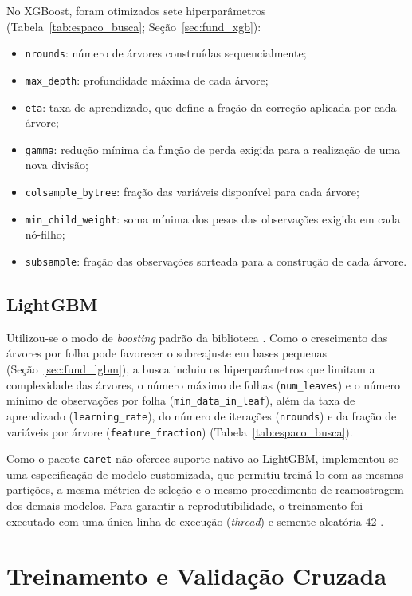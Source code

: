 No XGBoost, foram otimizados sete hiperparâmetros (Tabela~\ref{tab:espaco_busca}; Seção~\ref{sec:fund_xgb}):

\begin{itemize}
    \item \texttt{nrounds}: número de árvores construídas sequencialmente;
    \item \texttt{max\_depth}: profundidade máxima de cada árvore;
    \item \texttt{eta}: taxa de aprendizado, que define a fração da correção aplicada por cada árvore;
    \item \texttt{gamma}: redução mínima da função de perda exigida para a realização de uma nova divisão;
    \item \texttt{colsample\_bytree}: fração das variáveis disponível para cada árvore;
    \item \texttt{min\_child\_weight}: soma mínima dos pesos das observações exigida em cada nó-filho;
    \item \texttt{subsample}: fração das observações sorteada para a construção de cada árvore.
\end{itemize}

\subsection{LightGBM}
\label{sec:lightgbm}

Utilizou-se o modo de \textit{boosting} padrão da biblioteca \cite{Ke2017LightGBM}. Como o crescimento das árvores por folha pode favorecer o sobreajuste em bases pequenas (Seção~\ref{sec:fund_lgbm}), a busca incluiu os hiperparâmetros que limitam a complexidade das árvores, o número máximo de folhas (\texttt{num\_leaves}) e o número mínimo de observações por folha (\texttt{min\_data\_in\_leaf}), além da taxa de aprendizado (\texttt{learning\_rate}), do número de iterações (\texttt{nrounds}) e da fração de variáveis por árvore (\texttt{feature\_fraction}) (Tabela~\ref{tab:espaco_busca}).

Como o pacote \texttt{caret} não oferece suporte nativo ao LightGBM, implementou-se uma especificação de modelo customizada, que permitiu treiná-lo com as mesmas partições, a mesma métrica de seleção e o mesmo procedimento de reamostragem dos demais modelos. Para garantir a reprodutibilidade, o treinamento foi executado com uma única linha de execução (\textit{thread}) e semente aleatória 42 \cite{Pineau2020Improving}.

\section{Treinamento e Validação Cruzada}
\label{sec:treinamento_validacao}

